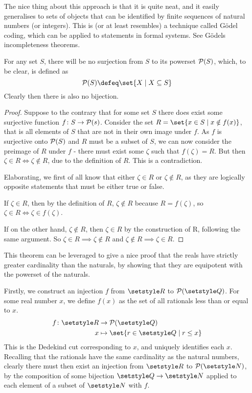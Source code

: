 The nice thing about this approach is that it is quite neat, and it easily
generalises to sets of objects that can be identified by finite sequences of
natural numbers (or integers). This is (or at least resembles) a technique
called G\"odel coding, which can be applied to statements in formal systems. See
G\"odels incompleteness theorems.

\begin{theorem}
 For any set \(S\), there will be no surjection from \(S\) to its powerset
 \(\operatorname{\mathcal P}(S)\), which, to be clear, is defined as
 \begin{equation*}
  \PowerSet(S) \defeq \set{X \mid X \subseteq S}
 \end{equation*}
 Clearly then there is also no bijection.
\end{theorem}
\begin{proof}
 Suppose to the contrary that for some set \(S\) there does exist some
 surjective function \(f \colon S \to \operatorname{\mathcal P}(s)\). Consider the set
 \(R = \set{x \in S \mid x \notin f(x)}\), that is all elements of \(S\) that
 are not in their own image under \(f\). As \(f\) is surjective onto
 \(\operatorname{\mathcal P}(S)\) and \(R\) must be a subset of \(S\), we can now consider the
 preimage of \(R\) under \(f\) - there must exist some \(\zeta\) such that
 \(f(\zeta) = R\). But then \(\zeta \in R \iff \zeta \notin R\), due to the
 definition of \(R\). This is a contradiction.

 Elaborating, we first of all know that either \(\zeta \in R\) or
 \(\zeta \notin R\), as they are logically opposite statements that must be
 either true or false.

 If \(\zeta \in R\), then by the definition of \(R\),
 \(\zeta \notin R\) because \(R = f(\zeta)\), so
 \(\zeta \in R \iff \zeta \in f(\zeta)\).

 If on the other hand, \(\zeta \notin R\), then \(\zeta \in R\) by the
 construction of R, following the same argument. So
 \(\zeta \in R \implies \zeta \notin R\) and
 \(\zeta \notin R \implies \zeta \in R\).
\end{proof}

This theorem can be leveraged to give a nice proof that the reals have strictly
greater cardinality than the naturals, by showing that they are equipotent with
the powerset of the naturals.

Firstly, we construct an injection \(f\) from \(\Reals\) to
\(\PowerSet(\Rationals)\). For some real number \(x\), we define \(f(x)\) as the
set of all rationals less than or equal to \(x\).
\begin{align*}
 f \colon \Reals &\to \PowerSet(\Rationals) \\
          x &\mapsto \set{r \in \Rationals \mid r \le x}
\end{align*}
This is the Dedekind cut corresponding to \(x\), and uniquely identifies each
\(x\). Recalling that the rationals have the same cardinality as the natural
numbers, clearly there must then exist an injection from \(\Reals\) to
\(\PowerSet(\Naturals)\), by the composition of some bijection
\(\Rationals \to \Naturals\) applied to each element of a subset of
\(\Naturals\) with \(f\).

